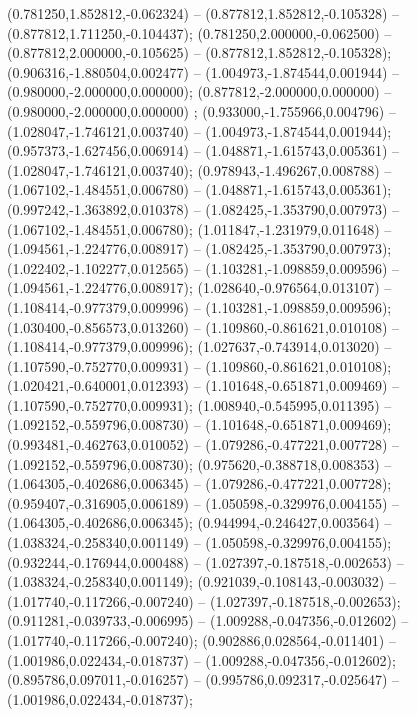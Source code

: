  (0.781250,1.852812,-0.062324) -- (0.877812,1.852812,-0.105328) -- (0.877812,1.711250,-0.104437);
 (0.781250,2.000000,-0.062500) -- (0.877812,2.000000,-0.105625) -- (0.877812,1.852812,-0.105328);
 (0.906316,-1.880504,0.002477) -- (1.004973,-1.874544,0.001944) -- (0.980000,-2.000000,0.000000);
 (0.877812,-2.000000,0.000000) -- (0.980000,-2.000000,0.000000) ;
 (0.933000,-1.755966,0.004796) -- (1.028047,-1.746121,0.003740) -- (1.004973,-1.874544,0.001944);
 (0.957373,-1.627456,0.006914) -- (1.048871,-1.615743,0.005361) -- (1.028047,-1.746121,0.003740);
 (0.978943,-1.496267,0.008788) -- (1.067102,-1.484551,0.006780) -- (1.048871,-1.615743,0.005361);
 (0.997242,-1.363892,0.010378) -- (1.082425,-1.353790,0.007973) -- (1.067102,-1.484551,0.006780);
 (1.011847,-1.231979,0.011648) -- (1.094561,-1.224776,0.008917) -- (1.082425,-1.353790,0.007973);
 (1.022402,-1.102277,0.012565) -- (1.103281,-1.098859,0.009596) -- (1.094561,-1.224776,0.008917);
 (1.028640,-0.976564,0.013107) -- (1.108414,-0.977379,0.009996) -- (1.103281,-1.098859,0.009596);
 (1.030400,-0.856573,0.013260) -- (1.109860,-0.861621,0.010108) -- (1.108414,-0.977379,0.009996);
 (1.027637,-0.743914,0.013020) -- (1.107590,-0.752770,0.009931) -- (1.109860,-0.861621,0.010108);
 (1.020421,-0.640001,0.012393) -- (1.101648,-0.651871,0.009469) -- (1.107590,-0.752770,0.009931);
 (1.008940,-0.545995,0.011395) -- (1.092152,-0.559796,0.008730) -- (1.101648,-0.651871,0.009469);
 (0.993481,-0.462763,0.010052) -- (1.079286,-0.477221,0.007728) -- (1.092152,-0.559796,0.008730);
 (0.975620,-0.388718,0.008353) -- (1.064305,-0.402686,0.006345) -- (1.079286,-0.477221,0.007728);
 (0.959407,-0.316905,0.006189) -- (1.050598,-0.329976,0.004155) -- (1.064305,-0.402686,0.006345);
 (0.944994,-0.246427,0.003564) -- (1.038324,-0.258340,0.001149) -- (1.050598,-0.329976,0.004155);
 (0.932244,-0.176944,0.000488) -- (1.027397,-0.187518,-0.002653) -- (1.038324,-0.258340,0.001149);
 (0.921039,-0.108143,-0.003032) -- (1.017740,-0.117266,-0.007240) -- (1.027397,-0.187518,-0.002653);
 (0.911281,-0.039733,-0.006995) -- (1.009288,-0.047356,-0.012602) -- (1.017740,-0.117266,-0.007240);
 (0.902886,0.028564,-0.011401) -- (1.001986,0.022434,-0.018737) -- (1.009288,-0.047356,-0.012602);
 (0.895786,0.097011,-0.016257) -- (0.995786,0.092317,-0.025647) -- (1.001986,0.022434,-0.018737);
